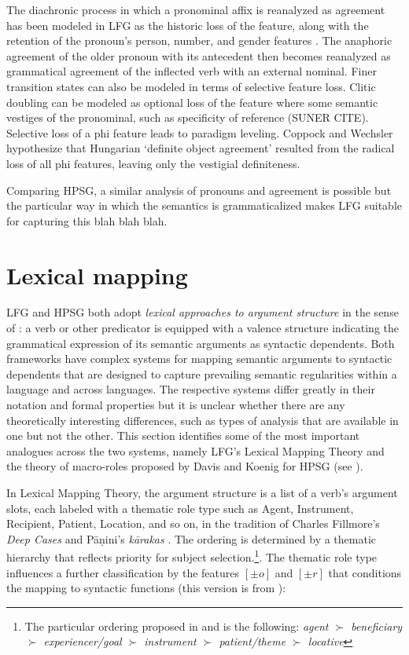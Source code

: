 The diachronic process in which a pronominal affix is reanalyzed as agreement has been modeled in LFG as the historic loss of the  feature, along with the retention of the pronoun's person, number, and gender features \citep{coppock+wechsler:2010}.  The anaphoric agreement of the older pronoun with its antecedent then becomes reanalyzed as grammatical agreement of the inflected verb with an external nominal.  Finer transition states can also be modeled in terms of selective feature loss.  Clitic doubling can be modeled as optional loss of the  feature where some semantic vestiges of the pronominal, such as specificity of reference (SUNER CITE).  Selective loss of a phi feature leads to paradigm leveling.   Coppock and Wechsler hypothesize that Hungarian `definite object agreement' resulted from the radical loss of all phi features, leaving only the vestigial definiteness.  

Comparing HPSG, a similar analysis of pronouns and agreement is possible but the particular way in which the semantics is grammaticalized makes LFG suitable for capturing this blah blah blah.  

                  
\section{Lexical mapping}
LFG and HPSG both adopt \textit{lexical approaches to argument structure} in the sense of \citet{MWArgSt}: a verb or other predicator is equipped with a valence structure indicating the grammatical expression of its semantic arguments as syntactic dependents.  Both frameworks have complex systems for mapping semantic arguments to syntactic dependents that are designed to capture prevailing semantic regularities within a language and across languages.   The respective systems differ greatly in their notation and formal properties but it is unclear whether 
there are any theoretically interesting differences, such as types of analysis that are available in one but not the other.  This section identifies some of the most important  analogues across the two systems, namely LFG's Lexical Mapping Theory \citep[chapter 14]{BATW2015a} and the theory of macro-roles proposed by Davis and Koenig for HPSG (see ).
 
In Lexical Mapping Theory, the argument structure is a list of a verb's argument slots, each labeled with a thematic role type such as Agent, Instrument, Recipient, Patient, Location, and so on, in the tradition of Charles Fillmore's \textit{Deep Cases} \citep{fillmore:1968,Fillmore:1977} and P\={a}\d{n}ini's \textit{k\={a}rakas} \citep{kiparsky+staal:1969}.  The ordering is determined by a thematic hierarchy that reflects priority for subject selection.\footnote{The particular ordering proposed in \cite{Bresnan+Kanerva:1989} and 
\cite{Bresnan+etal:2015} is the following:  
{\it agent $\succ$ beneficiary $\succ$
experiencer/goal $\succ$ instrument $\succ$ patient/theme $\succ$
locative}}.  The thematic role type influences a further classification by the features $[\pm o]$ and $[\pm r]$ that conditions the mapping to syntactic functions (this version is from \citet[p. \ 331]{Bresnan+etal:2015}):


